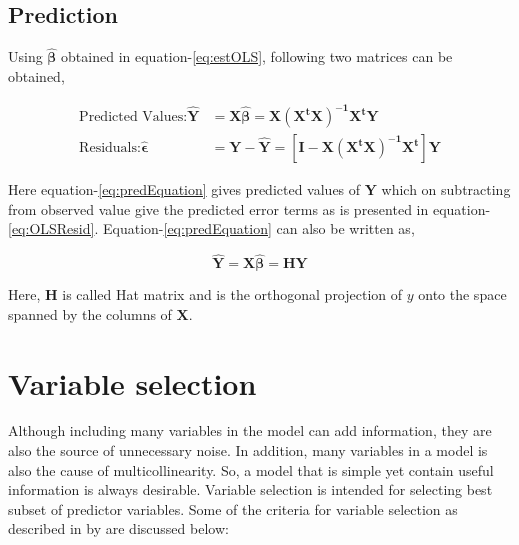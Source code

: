 \documentclass[12pt, lot, lof]{thesis}\usepackage[]{graphicx}\usepackage[]{color}
\newcommand{\bs}[1]{\ensuremath{\boldsymbol{#1}}}
\newcommand{\mbf}[1]{\ensuremath{\mathbf{#1}}}
\begin{document}
\subsection{Prediction}
\label{ssec:pred}

Using $\hat{\bs{\beta}}$ obtained in equation-\ref{eq:estOLS}, following two matrices can be obtained,

\begin{subequations}
\begin{align}
  \text{Predicted Values:}\hat{\mbf{Y}}   &=\mbf{X}\hat{\bs{\beta}}=\mbf{X(X^tX)^{-1}X^tY} \label{eq:predEquation}\\
  \text{Residuals:} \hat{\bs{\epsilon}}&=\mbf{Y}-\hat{\mbf{Y}} =[\mbf{I-X(X^tX)^{-1}X^t}]\mbf{Y} \label{eq:OLSResid}
\end{align}
\end{subequations}

Here equation-\ref{eq:predEquation} gives predicted values of $\mbf{Y}$ which on subtracting from observed value give the predicted error terms as is presented in equation-\ref{eq:OLSResid}. Equation-\ref{eq:predEquation} can also be written as, 

\begin{equation}
  \hat{\mbf{Y}} =\mbf{X}\hat{\bs{\beta}}=\mbf{HY} \label{eq:predHatEquation}
\end{equation}

Here, $\mbf{H}$ is called Hat matrix and is the orthogonal projection of $y$ onto the space spanned by the columns of $\mbf{X}$.

\section{Variable selection}
\label{sec:varSelection}
Although including many variables in the model can add information, they are also the source of unnecessary noise. In addition, many variables in a model is also the cause of multicollinearity. So, a model that is simple yet contain useful information is always desirable. Variable selection is intended for selecting best subset of predictor variables. Some of the criteria for variable selection as described in  by \citet{weisberg2005applied} are discussed below:
\end{document}
